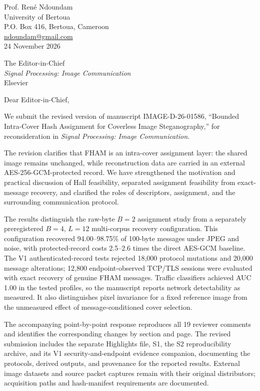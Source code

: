 \documentclass[12pt,a4paper]{article}
\begin{document}
\begin{flushright}
Prof. Ren\'e Ndoundam\\
University of Bertoua\\
P.O. Box 416, Bertoua, Cameroon\\
\href{mailto:ndoundam@gmail.com}{ndoundam@gmail.com}\\
24 November 2026
\end{flushright}

The Editor-in-Chief\\
\textit{Signal Processing: Image Communication}\\
Elsevier

Dear Editor-in-Chief,

We submit the revised version of manuscript IMAGE-D-26-01586, ``Bounded Intra-Cover Hash Assignment for Coverless Image Steganography,'' for reconsideration in \textit{Signal Processing: Image Communication}.

The revision clarifies that FHAM is an intra-cover assignment layer: the shared image remains unchanged, while reconstruction data are carried in an external AES-256-GCM-protected record. We have strengthened the motivation and practical discussion of Hall feasibility, separated assignment feasibility from exact-message recovery, and clarified the roles of descriptors, assignment, and the surrounding communication protocol.

The results distinguish the raw-byte $B=2$ assignment study from a separately preregistered $B=4$, $L=12$ multi-corpus recovery configuration. This configuration recovered 94.00--98.75\% of 100-byte messages under JPEG and noise, with protected-record costs 2.5--2.6 times the direct AES-GCM baseline. The V1 authenticated-record tests rejected 18,000 protocol mutations and 20,000 message alterations; 12,800 endpoint-observed TCP/TLS sessions were evaluated with exact recovery of genuine FHAM messages. Traffic classifiers achieved AUC 1.00 in the tested profiles, so the manuscript reports network detectability as measured. It also distinguishes pixel invariance for a fixed reference image from the unmeasured effect of message-conditioned cover selection.

The accompanying point-by-point response reproduces all 19 reviewer comments and identifies the corresponding changes by section and page. The revised submission includes the separate Highlights file, S1, the S2 reproducibility archive, and its V1 security-and-endpoint evidence companion, documenting the protocols, derived outputs, and provenance for the reported results. External image datasets and source packet captures remain with their original distributors; acquisition paths and hash-manifest requirements are documented.
\end{document}
